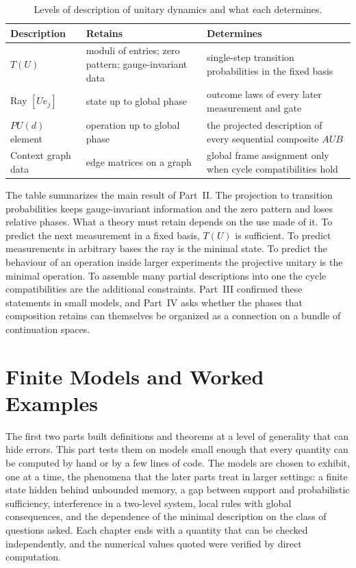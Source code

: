\documentclass[11pt,oneside]{book}
\theoremstyle{definition}
\theoremstyle{remark}
\begin{document}
\begin{table}[h]
\centering
\begin{tabular}{p{3.4cm}p{4.2cm}p{5.2cm}}
\hline
Description & Retains & Determines \\
\hline
$T(U)$ & moduli of entries; zero pattern; gauge-invariant data & single-step transition probabilities in the fixed basis \\
Ray $[Ue_j]$ & state up to global phase & outcome laws of every later measurement and gate \\
$PU(d)$ element & operation up to global phase & the projected description of every sequential composite $AUB$ \\
Context graph data & edge matrices on a graph & global frame assignment only when cycle compatibilities hold \\
\hline
\end{tabular}
\caption{Levels of description of unitary dynamics and what each determines.}
\end{table}

The table summarizes the main result of Part~II. The projection to transition probabilities keeps gauge-invariant information and the zero pattern and loses relative phases. What a theory must retain depends on the use made of it. To predict the next measurement in a fixed basis, $T(U)$ is sufficient. To predict measurements in arbitrary bases the ray is the minimal state. To predict the behaviour of an operation inside larger experiments the projective unitary is the minimal operation. To assemble many partial descriptions into one the cycle compatibilities are the additional constraints. Part~III confirmed these statements in small models, and Part~IV asks whether the phases that composition retains can themselves be organized as a connection on a bundle of continuation spaces.


\part{Finite Models and Worked Examples}

The first two parts built definitions and theorems at a level of generality that can hide errors. This part tests them on models small enough that every quantity can be computed by hand or by a few lines of code. The models are chosen to exhibit, one at a time, the phenomena that the later parts treat in larger settings: a finite state hidden behind unbounded memory, a gap between support and probabilistic sufficiency, interference in a two-level system, local rules with global consequences, and the dependence of the minimal description on the class of questions asked. Each chapter ends with a quantity that can be checked independently, and the numerical values quoted were verified by direct computation.
\end{document}

